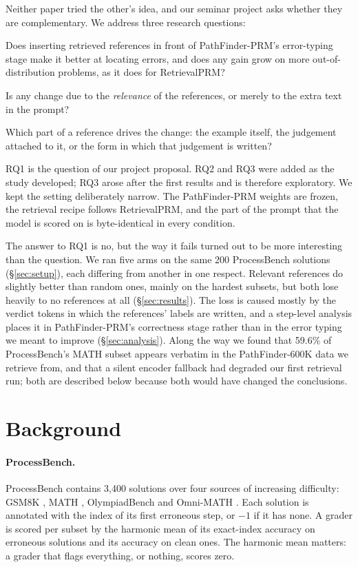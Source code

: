 \documentclass[11pt]{article}
\begin{document}
Neither paper tried the other's idea, and our seminar project asks whether they are
complementary. We address three research questions:
\begin{description}
  \setlength\itemsep{1pt}
  \item[RQ1] Does inserting retrieved references in front of PathFinder-PRM's error-typing
    stage make it better at locating errors, and does any gain grow on more
    out-of-distribution problems, as it does for RetrievalPRM?
  \item[RQ2] Is any change due to the \emph{relevance} of the references, or merely to the
    extra text in the prompt?
  \item[RQ3] Which part of a reference drives the change: the example itself, the judgement
    attached to it, or the form in which that judgement is written?
\end{description}
RQ1 is the question of our project proposal. RQ2 and RQ3 were added as the study developed;
RQ3 arose after the first results and is therefore exploratory.
We kept the setting deliberately narrow. The PathFinder-PRM weights are frozen, the retrieval
recipe follows RetrievalPRM, and the part of the prompt that the model is scored on is
byte-identical in every condition.

The answer to RQ1 is no, but the way it fails turned out to be more interesting than the
question. We ran five arms on the same 200 ProcessBench solutions (\S\ref{sec:setup}), each
differing from another in one respect. Relevant references do slightly better than random ones,
mainly on the hardest subsets, but both lose heavily to no references at all
(\S\ref{sec:results}). The loss is caused mostly by the verdict tokens in which the references'
labels are written, and a step-level analysis places it in PathFinder-PRM's correctness stage
rather than in the error typing we meant to improve (\S\ref{sec:analysis}). Along the way we
found that 59.6\% of ProcessBench's MATH subset appears verbatim in the PathFinder-600K data we
retrieve from, and that a silent encoder fallback had degraded our first retrieval run; both are
described below because both would have changed the conclusions.

\section{Background}
\label{sec:background}

\paragraph{ProcessBench.} ProcessBench \citep{zheng2024processbench} contains 3{,}400
solutions over four sources of increasing difficulty: GSM8K \citep{cobbe2021gsm8k}, MATH
\citep{hendrycks2021math}, OlympiadBench \citep{he2024olympiadbench} and Omni-MATH
\citep{gao2024omnimath}. Each solution is annotated with the index of its first erroneous step,
or $-1$ if it has none. A grader is scored per subset by the harmonic mean of its exact-index
accuracy on erroneous solutions and its accuracy on clean ones. The harmonic mean matters: a
grader that flags everything, or nothing, scores zero.
\end{document}
